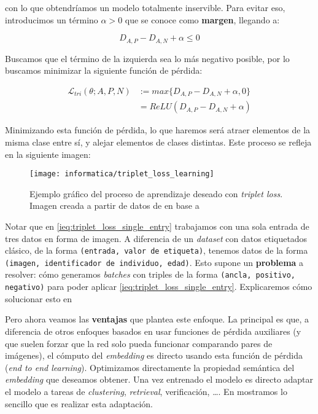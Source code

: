 con lo que obtendríamos un modelo totalmente inservible. Para evitar eso, introducimos un término $\alpha > 0$ que se conoce como \textbf{margen}, llegando a:

\begin{equation}
    D_{A, P} - D_{A, N} + \alpha \leq 0
\end{equation}

Buscamos que el término de la izquierda sea lo más negativo posible, por lo buscamos minimizar la siguiente función de pérdida:

\begin{equation} \label{ieq:triplet_loss_single_entry}
\begin{split}
    \mathcal{L}_{tri}(\theta; A, P, N) & := max \{D_{A, P} - D_{A, N} + \alpha, 0 \} \\
    &= ReLU(D_{A, P} - D_{A, N} + \alpha)
\end{split}
\end{equation}

Minimizando esta función de pérdida, lo que haremos será atraer elementos de la misma clase entre sí, y alejar elementos de clases distintas. Este proceso se refleja en la siguiente imagen:

\begin{figure}[H]
    \centering
    \texttt{[image: informatica/triplet\_loss\_learning]}
    \caption{Ejemplo gráfico del proceso de aprendizaje deseado con \textit{triplet loss}. Imagen creada a partir de datos de \cite{informatica:cacd_dataset} en base a \cite{informatica:facenet}}
\end{figure}

Notar que en \eqref{ieq:triplet_loss_single_entry} trabajamos con una sola entrada de tres datos en forma de imagen. A diferencia de un \textit{dataset} con datos etiquetados clásico, de la forma \lstinline{(entrada, valor de etiqueta)}, tenemos datos de la forma \lstinline{(imagen, identificador de individuo, edad)}. Esto supone un \textbf{problema} a resolver: cómo generamos \textit{batches} con triples de la forma \lstinline{(ancla, positivo, negativo)} para poder aplicar \eqref{ieq:triplet_loss_single_entry}. Explicaremos cómo solucionar esto en 

Pero ahora veamos las \textbf{ventajas} que plantea este enfoque. La principal es que, a diferencia de otros enfoques basados en usar funciones de pérdida auxiliares (y que suelen forzar que la red solo pueda funcionar comparando pares de imágenes), el cómputo del \textit{embedding} es directo usando esta función de pérdida (\textit{end to end learning}). Optimizamos directamente la propiedad semántica del \textit{embedding} que deseamos obtener. Una vez entrenado el modelo es directo adaptar el modelo a tareas de \textit{clustering}, \textit{retrieval}, verificación, \ldots \cite{informatica:principal}. En  mostramos lo sencillo que es realizar esta adaptación.

